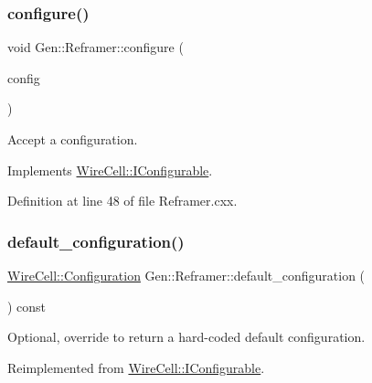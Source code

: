 \subsubsection{\texorpdfstring{configure()}{configure()}}
{\footnotesize\ttfamily void Gen\+::\+Reframer\+::configure (\begin{DoxyParamCaption}\item[{const \hyperlink{namespace_wire_cell_a9f705541fc1d46c608b3d32c182333ee}{Wire\+Cell\+::\+Configuration} \&}]{config }\end{DoxyParamCaption})\hspace{0.3cm}{\ttfamily [virtual]}}



Accept a configuration. 



Implements \hyperlink{class_wire_cell_1_1_i_configurable_a57ff687923a724093df3de59c6ff237d}{Wire\+Cell\+::\+I\+Configurable}.



Definition at line 48 of file Reframer.\+cxx.

\mbox{\label{class_wire_cell_1_1_gen_1_1_reframer_ad7d66a100026793f7ba7f284baff298f}} 
\subsubsection{\texorpdfstring{default\+\_\+configuration()}{default\_configuration()}}
{\footnotesize\ttfamily \hyperlink{namespace_wire_cell_a9f705541fc1d46c608b3d32c182333ee}{Wire\+Cell\+::\+Configuration} Gen\+::\+Reframer\+::default\+\_\+configuration (\begin{DoxyParamCaption}{ }\end{DoxyParamCaption}) const\hspace{0.3cm}{\ttfamily [virtual]}}



Optional, override to return a hard-\/coded default configuration. 



Reimplemented from \hyperlink{class_wire_cell_1_1_i_configurable_a54841b2da3d1ea02189478bff96f7998}{Wire\+Cell\+::\+I\+Configurable}.



